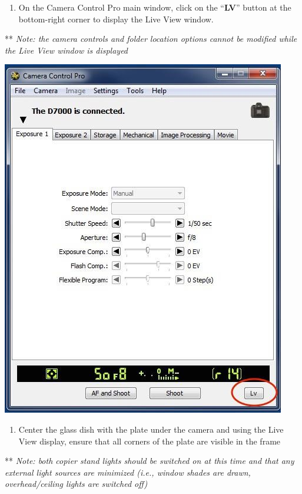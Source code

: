 \documentclass[]{book}
\providecommand{\tightlist}{%
  \setlength{\itemsep}{0pt}\setlength{\parskip}{0pt}}
\begin{document}
\begin{enumerate}
\def\labelenumi{\arabic{enumi}.}
\setcounter{enumi}{8}
\tightlist
\item
  On the Camera Control Pro main window, click on the ``\textbf{LV}'' button at the bottom-right corner to display the Live View window.
\end{enumerate}

** \emph{Note: the camera controls and folder location options cannot be modified while the Live View window is displayed}

\includegraphics{images/Camera14.jpg}

\begin{enumerate}
\def\labelenumi{\arabic{enumi}.}
\setcounter{enumi}{9}
\tightlist
\item
  Center the glass dish with the plate under the camera and using the Live View display, ensure that all corners of the plate are visible in the frame
\end{enumerate}

** \emph{Note: both copier stand lights should be switched on at this time and that any external light sources are minimized (i.e., window shades are drawn, overhead/ceiling lights are switched off)}
\end{document}
